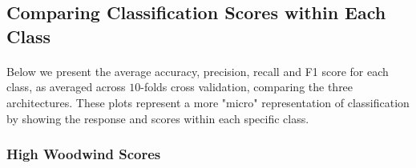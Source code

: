 \documentclass[12pt,letterpaper]{article}
\begin{document}

\subsection{Comparing Classification Scores within Each Class}
\label{subsec-ClassScores}

\paragraph*{}Below we present the average accuracy, precision, recall and F1 score for each class, as averaged across $10$-folds cross validation, comparing the three architectures. These plots represent a more "micro" representation of classification by showing the response and scores within each specific class.


\subsubsection{High Woodwind Scores}
\end{document}
